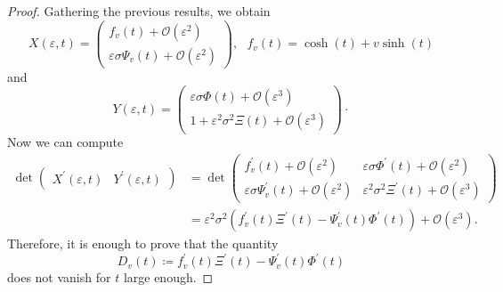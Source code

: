 \documentclass{article}
\numberwithin{equation}{section}        %
\theoremstyle{bfnote}
\theoremstyle{definition}
\theoremstyle{bfremark}
\begin{document}
\begin{proof}
    Gathering the previous results, we obtain
    \begin{equation*}
        X(\varepsilon,t) = \begin{pmatrix}
            f_v(t) + \mathcal{O}(\varepsilon^2) \\ \varepsilon \sigma \Psi_v(t) + \mathcal{O}(\varepsilon^2)
        \end{pmatrix}, ~~~ f_v(t) = \cosh(t) + v \sinh(t)
    \end{equation*}
    and 
    \begin{equation*}
        Y(\varepsilon,t) = \begin{pmatrix}
            \varepsilon \sigma \Phi(t) + \mathcal{O}(\varepsilon^3) \\ 1 +\varepsilon^2 \sigma^2 \Xi(t) + \mathcal{O}(\varepsilon^3)
        \end{pmatrix} \cdot
    \end{equation*}
    Now we can compute
    \begin{align*}
        \det \begin{pmatrix} X^\prime(\varepsilon,t) & Y^\prime(\varepsilon,t) \end{pmatrix} & = \det \begin{pmatrix}
            f^\prime_v(t) + \mathcal{O}(\varepsilon^2) & \varepsilon \sigma \Phi^\prime(t) + \mathcal{O}(\varepsilon^2) \\ \varepsilon \sigma \Psi_v^\prime(t) + \mathcal{O}(\varepsilon^2) & \varepsilon^2 \sigma^2 \Xi^\prime(t) + \mathcal{O}(\varepsilon^3) 
        \end{pmatrix} \\
        & = \varepsilon^2 \sigma^2 (f^\prime_v(t) \Xi^\prime(t)-\Psi^\prime_v(t) \Phi^\prime(t)) + \mathcal{O}(\varepsilon^3) .
    \end{align*}
    Therefore, it is enough to prove that the quantity 
    \begin{equation*}
        D_v(t) \coloneqq f^\prime_v(t) \Xi^\prime(t)-\Psi^\prime_v(t) \Phi^\prime(t)
    \end{equation*}
    does not vanish for $t$ large enough. 


\end{proof}
\end{document}
